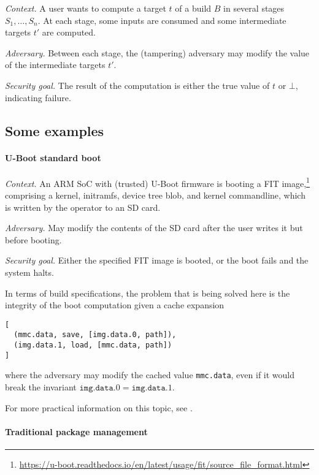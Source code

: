 \emph{Context.} A user wants to compute a target \(t\) of a build \(B\)
in several stages \(S_1,\ldots,S_n\). At each stage, some inputs are
consumed and some intermediate targets \(t'\) are computed.

\emph{Adversary.} Between each stage, the (tampering) adversary may
modify the value of the intermediate targets \(t'\).

\emph{Security goal.} The result of the computation is either the true
value of \(t\) or \(\bot\), indicating failure.


\subsection{Some examples}

\paragraph{U-Boot standard boot}

\emph{Context.} An ARM SoC with (trusted) U-Boot firmware is booting a FIT
image,\footnote{\url{https://u-boot.readthedocs.io/en/latest/usage/fit/source_file_format.html}} comprising a kernel, initramfs, device tree blob, and kernel
commandline, which is written by the operator to an SD card.

\emph{Adversary.} May modify the contents of the SD card after the user writes it but before booting.

\emph{Security goal.} Either the specified FIT image is booted, or the boot fails and the system halts.


In terms of build specifications, the problem that is being solved here is the integrity of the boot computation given a cache expansion
\begin{verbatim}
[
  (mmc.data, save, [img.data.0, path]),
  (img.data.1, load, [mmc.data, path])
]
\end{verbatim}
where the adversary may modify the cached value \texttt{mmc.data}, even if it would break the invariant $\mathtt{img.data.0} = \mathtt{img.data.1}$.

For more practical information on this topic, see \cite{timesys2023securing}.

\hypertarget{traditional-package-management}{%
\paragraph{Traditional package
management}\label{traditional-package-management}}

